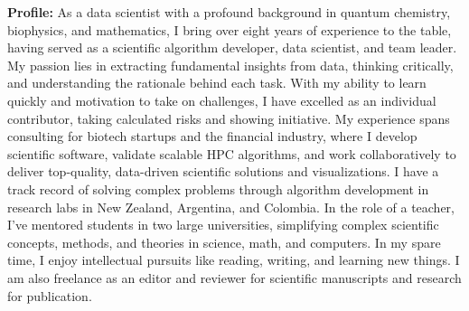 
\vspace*{-3mm}
\begin{tcolorbox}[
        width=\textwidth,
        colback={gray!30},
        colframe=white,
        sharp corners,
        boxrule=0mm,
        arc=1mm,
    ]
    \begin{spacing}{1.2}
        \begin{multicols}{2}
            {\bf\large Profile:}
            As a data scientist with a profound background in quantum chemistry, biophysics, and mathematics, I bring over eight years of experience to the table, having served as a scientific algorithm developer, data scientist, and team leader. My passion lies in extracting fundamental insights from data, thinking critically, and understanding the rationale behind each task. With my ability to learn quickly and motivation to take on challenges, I have excelled as an individual contributor, taking calculated risks and showing initiative. My experience spans consulting for biotech startups and the financial industry, where I develop scientific software, validate scalable HPC algorithms, and work collaboratively to deliver top-quality, data-driven scientific solutions and visualizations. I have a track record of solving complex problems through algorithm development in research labs in New Zealand, Argentina, and Colombia. In the role of a teacher, I've mentored students in two large universities, simplifying complex scientific concepts, methods, and theories in science, math, and computers. In my spare time, I enjoy intellectual pursuits like reading, writing, and learning new things. I am also freelance as an editor and reviewer for scientific manuscripts and research for publication.

        \end{multicols}
    \end{spacing}
    \vspace*{-1mm}

\end{tcolorbox}